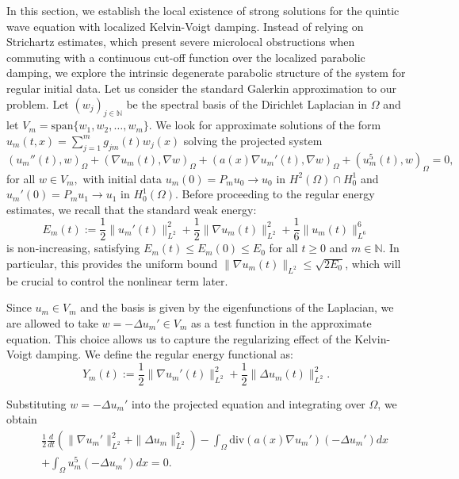 \documentclass[11pt,letterpaper]{amsart}
\begin{document}
In this section, we establish the local existence of strong solutions for the quintic wave equation with localized Kelvin-Voigt damping. Instead of relying on Strichartz estimates, which present severe microlocal obstructions when commuting with a continuous cut-off function over the localized parabolic damping, we explore the intrinsic degenerate parabolic structure of the system for regular initial data. Let us consider the standard Galerkin approximation to our problem. Let $(w_j)_{j\in \mathbb{N}}$ be the spectral basis of the Dirichlet Laplacian in $\Omega$ and let $V_m = \text{span}\{w_1, w_2, \dots, w_m\}$. We look for approximate solutions of the form $u_m(t,x) = \sum_{j=1}^m g_{jm}(t) w_j(x)$ solving the projected system
$$(u_m''(t), w)_\Omega + (\nabla u_m(t), \nabla w)_\Omega + (a(x)\nabla u_m'(t), \nabla w)_\Omega + (u_m^5(t), w)_\Omega = 0,$$
for all $w \in V_m,$ with initial data $u_m(0) = P_m u_0 \to u_0$ in $H^2(\Omega) \cap H_0^1$ and $u_m'(0) = P_m u_1 \to u_1$ in $H_0^1(\Omega)$. Before proceeding to the regular energy estimates, we recall that the standard weak energy:
$$E_m(t) := \frac{1}{2}\|u_m'(t)\|_{L^2}^2 + \frac{1}{2}\|\nabla u_m(t)\|_{L^2}^2 + \frac{1}{6}\|u_m(t)\|_{L^6}^6$$
is non-increasing, satisfying $E_m(t) \le E_m(0) \le E_0$ for all $t \ge 0$ and $m\in \mathbb{N}$. In particular, this provides the uniform bound $\|\nabla u_m(t)\|_{L^2} \le \sqrt{2 E_0}$, which will be crucial to control the nonlinear term later.


Since $u_m \in V_m$ and the basis is given by the eigenfunctions of the Laplacian, we are allowed to take $w = -\Delta u_m' \in V_m$ as a test function in the approximate equation. This choice allows us to capture the regularizing effect of the Kelvin-Voigt damping. We define the regular energy functional as:
$$Y_m(t) := \frac{1}{2}\|\nabla u_m'(t)\|_{L^2}^2 + \frac{1}{2}\|\Delta u_m(t)\|_{L^2}^2.$$

Substituting $w = -\Delta u_m'$ into the projected equation and integrating  over $\Omega$, we obtain
\begin{eqnarray*}
&&\frac{1}{2}\frac{d}{dt} \left( \|\nabla u_m'\|_{L^2}^2 + \|\Delta u_m\|_{L^2}^2 \right) - \int_\Omega \text{div}(a(x)\nabla u_m')(-\Delta u_m') dx\\
&&+ \int_\Omega u_m^5 (-\Delta u_m') dx = 0.
\end{eqnarray*}

\end{document}
